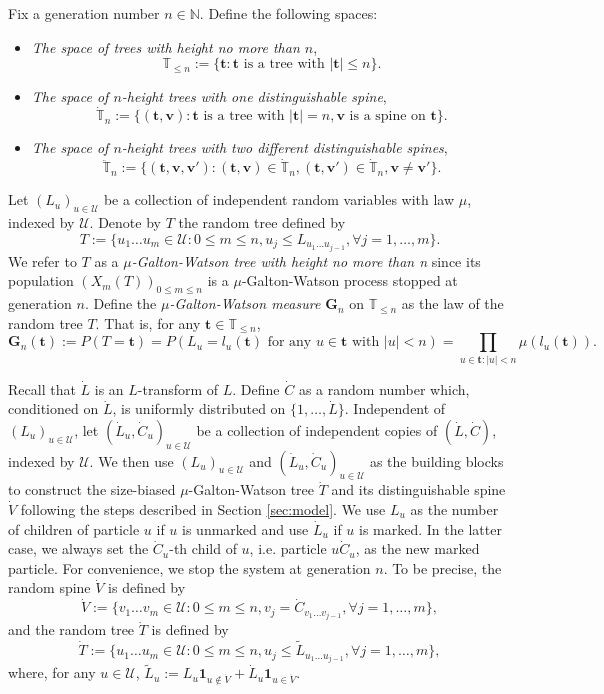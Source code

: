 \documentclass[12pt,a4paper]{amsart}
\numberwithin{equation}{section}
\begin{document}
	Fix a generation number $n\in \mathbb N$. Define the following spaces:
\begin{itemize}
\item
	\emph{The space of trees with height no more than $n$},
\[
		\mathbb T_{\leq n}
	:=\{ \mathbf t : \mathbf t \text{ is a tree with }| \mathbf t | \leq n\}.
\]
\item
	\emph {The space of $n$-height trees with one distinguishable spine},
\[
		\dot{\mathbb T}_n
	:=\{( \mathbf t , \mathbf v): \mathbf t  \text{ is a tree with } | \mathbf t |=n,  \mathbf v \text{ is a spine on }  \mathbf t \}.
\]
\item
	\emph{The space of $n$-height trees with two different distinguishable spines},
\[
		\ddot{\mathbb T}_n
	:=\{( \mathbf t , \mathbf v, \mathbf v'):( \mathbf t , \mathbf v)\in\dot{\mathbb T}_n,( \mathbf t , \mathbf v')\in\dot{\mathbb T}_n, \mathbf v\neq \mathbf v'\}.
\]
\end{itemize}

	Let $(L_u)_{u\in\mathcal U}$ be a collection of independent random variables with law $\mu$, indexed by $\mathcal U$.
	Denote by $T$ the random tree defined by
\[
		T
	:=\{u_1\dots u_m\in \mathcal U: 0\le m\le n, u_j\leq L_{u_1\dots u_{j-1}},\forall j=1,\dots,m\}.
\]
	We refer to $T$ as a \emph{$\mu$-Galton-Watson tree with height no more than n} since its population $(X_m(T))_{0\le m\le n}$ is a $\mu$-Galton-Watson process stopped at generation $n$.
	Define the \emph{$\mu$-Galton-Watson measure $\mathbf G_n$} on $\mathbb T_{\leq n}$ as the law of the random tree $T$.
	That is, for any $ \mathbf t \in\mathbb T_{\leq n}$,
\[
		\mathbf G_n( \mathbf t )
    :=P(T= \mathbf t )
	=P(L_u=l_u( \mathbf t )\text{ for any } u\in \mathbf t  \text{ with }|u|<n)
	=\prod_{u\in  \mathbf t :|u|<n}\mu(l_u( \mathbf t )).
\]

	Recall that $\dot L$ is an $L$-transform of $L$.
	Define $\dot C$ as a random number which, conditioned on $\dot L$, is uniformly distributed on $\{1,\dots,\dot L\}$.
	Independent of $(L_u)_{u\in\mathcal U}$, let $(\dot L_u,\dot C_u)_{u\in \mathcal U}$ be a collection of independent copies of $(\dot L,\dot C)$, indexed by $\mathcal U$.
	We then use $(L_u)_{u\in\mathcal U}$ and $(\dot L_u,\dot C_u)_{u\in\mathcal U}$ as the building blocks to construct the size-biased $\mu$-Galton-Watson tree $\dot T$ and its distinguishable spine $\dot V$ following the steps described in Section \ref{sec:model}.
	We use $L_u$ as the number of children of particle $u$ if $u$ is unmarked and use $\dot L_u$ if $u$ is marked.
	In the latter case, we always set the
	$\dot C_u$-th child of $u$, i.e. particle $u \dot C_u$,
	as the new marked particle.
	For convenience, we stop the system at generation $n$. To be precise, the random spine $\dot V$ is defined by
\[
		\dot V
	:=\{v_1\dots v_m\in \mathcal U:0\le m\le n, v_j=\dot C_{v_1\dots v_{j-1}},\forall j=1,\dots,m\},
\]
	and the random tree $\dot T$ is defined by
\[
		\dot T
	:=\{u_1\dots u_m\in\mathcal U: 0\le m\le n,u_j\leq \tilde L_{u_1\dots u_{j-1}},\forall j=1,\dots,m\},
\]
	where, for any $u\in\mathcal U$, $\tilde L_u:=L_u\mathbf 1_{u\not\in \dot V}+\dot L_u\mathbf 1_{u\in \dot V}$.
\end{document}
